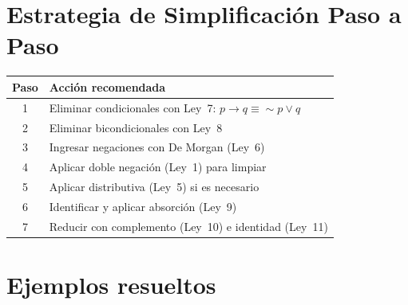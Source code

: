 \section{Estrategia de Simplificaci\'{o}n Paso a Paso}

\begin{cajaformula}
  \renewcommand{\arraystretch}{1.5}
  \begin{center}
  \begin{tabular}{@{}cl@{}}
    \toprule
    \rowcolor{AzulClaro!60}
    \textbf{Paso} & \textbf{Acción recomendada} \\
    \midrule
    1 & Eliminar condicionales con Ley~7:
        $p \rightarrow q \equiv \sim p \vee q$ \\
    2 & Eliminar bicondicionales con Ley~8 \\
    3 & Ingresar negaciones con De Morgan (Ley~6) \\
    4 & Aplicar doble negación (Ley~1) para limpiar \\
    5 & Aplicar distributiva (Ley~5) si es necesario \\
    6 & Identificar y aplicar absorción (Ley~9) \\
    7 & Reducir con complemento (Ley~10) e identidad (Ley~11) \\
    \bottomrule
  \end{tabular}
  \end{center}
\end{cajaformula}

\section{Ejemplos resueltos}

